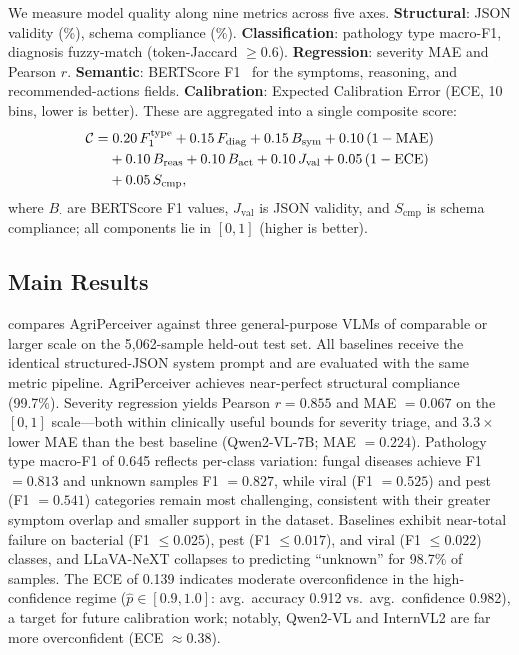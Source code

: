 \documentclass{article}
\newcommand{\ours}{AgriPerceiver}
\begin{document}
We measure model quality along nine metrics across five axes.
\textbf{Structural}: JSON validity (\%), schema compliance (\%).
\textbf{Classification}: pathology type macro-F1, diagnosis
fuzzy-match (token-Jaccard $\geq 0.6$).
\textbf{Regression}: severity MAE and Pearson $r$.
\textbf{Semantic}: BERTScore F1~\citep{zhang2020bertscore} for the
symptoms, reasoning, and recommended-actions fields.
\textbf{Calibration}: Expected Calibration Error (ECE, 10 bins,
lower is better).
These are aggregated into a single composite score:
\begin{align}
  \mathcal{C} =&\; 0.20\,F_1^{\text{type}}
    + 0.15\,F_{\text{diag}}
    + 0.15\,B_{\text{sym}}
    + 0.10\,(1 - \mathrm{MAE}) \notag\\
    &+ 0.10\,B_{\text{reas}}
    + 0.10\,B_{\text{act}}
    + 0.10\,J_{\text{val}}
    + 0.05\,(1 - \mathrm{ECE}) \notag\\
    &+ 0.05\,S_{\text{cmp}},
  \label{eq:composite}
\end{align}
where $B_{\cdot}$ are BERTScore F1 values, $J_{\text{val}}$ is JSON
validity, and $S_{\text{cmp}}$ is schema compliance; all components
lie in $[0,1]$ (higher is better).




\subsection{Main Results}

 compares \ours{} against three general-purpose VLMs
of comparable or larger scale on the 5,062-sample held-out test set. All baselines receive the identical structured-JSON system prompt and are evaluated with the same metric pipeline. \ours{} achieves near-perfect structural compliance (99.7\%).
Severity regression yields Pearson $r = 0.855$ and MAE $= 0.067$ on
the $[0,1]$ scale---both within clinically useful bounds for
severity triage, and $3.3\times$ lower MAE than the best baseline
(Qwen2-VL-7B; MAE $= 0.224$).
Pathology type macro-F1 of 0.645 reflects per-class variation: fungal
diseases achieve F1 $= 0.813$ and unknown samples F1 $= 0.827$, while
viral (F1 $= 0.525$) and pest (F1 $= 0.541$) categories remain most
challenging, consistent with their greater symptom overlap and smaller
support in the dataset.
Baselines exhibit near-total failure on bacterial (F1 $\leq 0.025$),
pest (F1 $\leq 0.017$), and viral (F1 $\leq 0.022$) classes, and
LLaVA-NeXT collapses to predicting ``unknown'' for 98.7\% of samples.
The ECE of 0.139 indicates moderate overconfidence in the
high-confidence regime ($\hat{p} \in [0.9, 1.0]$: avg.\ accuracy 0.912
vs.\ avg.\ confidence 0.982), a target for future calibration work;
notably, Qwen2-VL and InternVL2 are far more overconfident
(ECE $\approx 0.38$).
\end{document}
